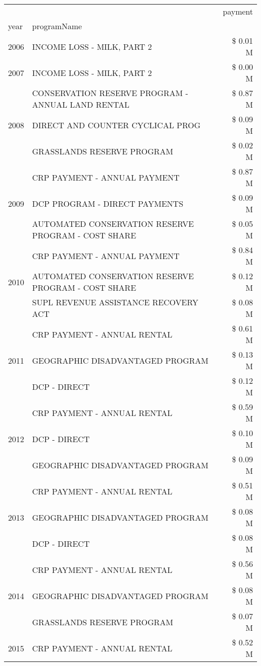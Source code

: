 \begin{tabular}{llr}
\toprule
 &  & payment \\
year & programName &  \\
\midrule
2006 & INCOME LOSS - MILK, PART 2 & \$ 0.01 M \\
\cline{1-3}
2007 & INCOME LOSS - MILK, PART 2 & \$ 0.00 M \\
\cline{1-3}
\multirow[t]{3}{*}{2008} & CONSERVATION RESERVE PROGRAM - ANNUAL LAND RENTAL & \$ 0.87 M \\
 & DIRECT AND COUNTER CYCLICAL PROG & \$ 0.09 M \\
 & GRASSLANDS RESERVE PROGRAM & \$ 0.02 M \\
\cline{1-3}
\multirow[t]{3}{*}{2009} & CRP PAYMENT - ANNUAL PAYMENT & \$ 0.87 M \\
 & DCP PROGRAM - DIRECT PAYMENTS & \$ 0.09 M \\
 & AUTOMATED CONSERVATION RESERVE PROGRAM - COST SHARE & \$ 0.05 M \\
\cline{1-3}
\multirow[t]{3}{*}{2010} & CRP PAYMENT - ANNUAL PAYMENT & \$ 0.84 M \\
 & AUTOMATED CONSERVATION RESERVE PROGRAM - COST SHARE & \$ 0.12 M \\
 & SUPL REVENUE ASSISTANCE RECOVERY ACT & \$ 0.08 M \\
\cline{1-3}
\multirow[t]{3}{*}{2011} & CRP PAYMENT - ANNUAL RENTAL & \$ 0.61 M \\
 & GEOGRAPHIC DISADVANTAGED PROGRAM & \$ 0.13 M \\
 & DCP - DIRECT & \$ 0.12 M \\
\cline{1-3}
\multirow[t]{3}{*}{2012} & CRP PAYMENT - ANNUAL RENTAL & \$ 0.59 M \\
 & DCP - DIRECT & \$ 0.10 M \\
 & GEOGRAPHIC DISADVANTAGED PROGRAM & \$ 0.09 M \\
\cline{1-3}
\multirow[t]{3}{*}{2013} & CRP PAYMENT - ANNUAL RENTAL & \$ 0.51 M \\
 & GEOGRAPHIC DISADVANTAGED PROGRAM & \$ 0.08 M \\
 & DCP - DIRECT & \$ 0.08 M \\
\cline{1-3}
\multirow[t]{3}{*}{2014} & CRP PAYMENT - ANNUAL RENTAL & \$ 0.56 M \\
 & GEOGRAPHIC DISADVANTAGED PROGRAM & \$ 0.08 M \\
 & GRASSLANDS RESERVE PROGRAM & \$ 0.07 M \\
\cline{1-3}
\multirow[t]{3}{*}{2015} & CRP PAYMENT - ANNUAL RENTAL & \$ 0.52 M \\

\end{tabular}
